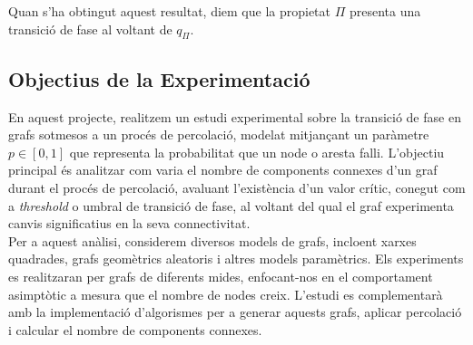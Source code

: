 \documentclass[a4paper]{article}
\begin{document}
	Quan s'ha obtingut aquest resultat, diem que la propietat $\Pi$ presenta una transició de fase al voltant de $q_{\Pi}$. \\
	
	\subsection{Objectius de la Experimentació}
	
	En aquest projecte, realitzem un estudi experimental sobre la transició de fase en grafs sotmesos a un procés de percolació, modelat mitjançant un paràmetre $p \in [0, 1]$ que representa la probabilitat que un node o aresta falli. L'objectiu principal és analitzar com varia el nombre de components connexes d'un graf durant el procés de percolació, avaluant l'existència d'un valor crític, conegut com a \textit{threshold} o umbral de transició de fase, al voltant del qual el graf experimenta canvis significatius en la seva connectivitat. \\
	
	Per a aquest anàlisi, considerem diversos models de grafs, incloent xarxes quadrades, grafs geomètrics aleatoris i altres models paramètrics. Els experiments es realitzaran per grafs de diferents mides, enfocant-nos en el comportament asimptòtic a mesura que el nombre de nodes creix. L'estudi es complementarà amb la implementació d'algorismes per a generar aquests grafs, aplicar percolació i calcular el nombre de components connexes. \\
	
\end{document}
